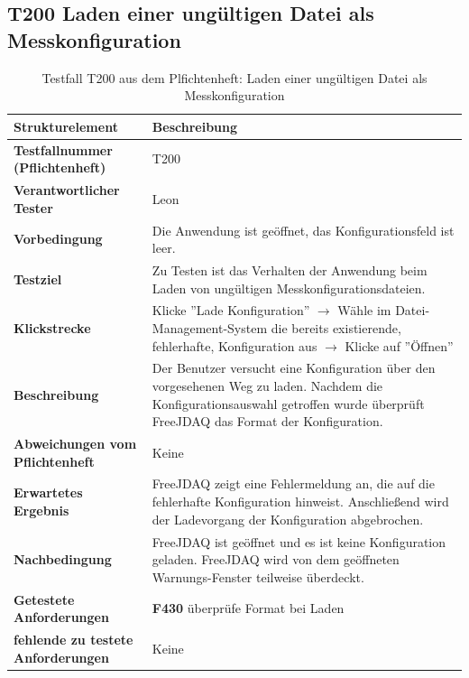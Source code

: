 \documentclass[parskip=full]{scrartcl}
\begin{document}
\subsection{\textbf{T200} Laden einer ungültigen Datei als Messkonfiguration}

\begin{table}[h]
    \begin{tabular}{| p{4cm} | p{10cm} |}
        \hline
        \textbf{Strukturelement} & \textbf{Beschreibung} \\ \hline
        \textbf{Testfallnummer (Pflichtenheft)}
        & 
        T200
        \\ \hline
        \textbf{Verantwortlicher Tester}
        & 
        Leon
        \\ \hline
        \textbf{Vorbedingung}
        & 
        Die Anwendung ist geöffnet, das Konfigurationsfeld ist leer.
        \\ \hline
        \textbf{ Testziel}
        & 
        Zu Testen ist das Verhalten der Anwendung beim Laden von ungültigen
        Messkonfigurationsdateien.
        \\ \hline
        
        \textbf{Klickstrecke}
        & 
        Klicke ''Lade Konfiguration'' $\rightarrow$ Wähle im Datei-Management-System die bereits existierende, fehlerhafte, Konfiguration aus $\rightarrow$ Klicke auf ''Öffnen''
        \\ \hline
        
        \textbf{ Beschreibung}
        & 
        Der Benutzer versucht eine Konfiguration über den vorgesehenen Weg zu laden. Nachdem die Konfigurationsauswahl getroffen wurde überprüft FreeJDAQ das Format der Konfiguration.
        \\ \hline
        
        \textbf{Abweichungen vom Pflichtenheft}
        & 
        Keine
        
        \\ \hline
        
        \textbf{Erwartetes Ergebnis}
        & 
        FreeJDAQ zeigt eine Fehlermeldung an, die auf die fehlerhafte Konfiguration hinweist. Anschließend wird der Ladevorgang der Konfiguration abgebrochen.
        \\ \hline
        
        \textbf{Nachbedingung}
        & 
        FreeJDAQ ist geöffnet und es ist keine Konfiguration geladen. FreeJDAQ wird von dem geöffneten Warnungs-Fenster teilweise überdeckt.
        \\ \hline
        
        
        \textbf{Getestete Anforderungen}
        & 
        \textbf{F430} überprüfe Format bei Laden
        \\ \hline
        \textbf{fehlende zu testete Anforderungen}
        & 
        Keine
        \\ \hline
        
        
    \end{tabular}
    \caption{Testfall T200 aus dem Plfichtenheft: Laden einer ungültigen Datei als Messkonfiguration}
    \label{testfallT200}
\end{table}
\end{document}

